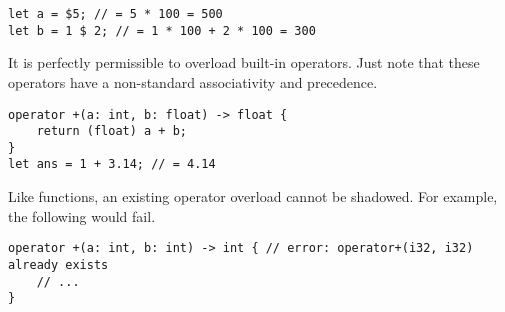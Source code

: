 \begin{lstlisting}[language=CustomLang]
let a = $5; // = 5 * 100 = 500
let b = 1 $ 2; // = 1 * 100 + 2 * 100 = 300
\end{lstlisting}

It is perfectly permissible to overload built-in operators.
Just note that these operators have a non-standard associativity and precedence.

\begin{lstlisting}[language=CustomLang]
operator +(a: int, b: float) -> float {
    return (float) a + b;
}
let ans = 1 + 3.14; // = 4.14
\end{lstlisting}

Like functions, an existing operator overload cannot be shadowed.
For example, the following would fail.

\begin{lstlisting}[language=CustomLang]
operator +(a: int, b: int) -> int { // error: operator+(i32, i32) already exists
    // ...
}
\end{lstlisting}
